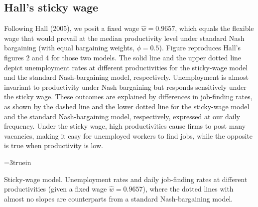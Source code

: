 \subsection{Hall's sticky wage}\label{sec:FS_Hall_simul}%
Following  Hall (2005),  we posit a
fixed wage $\hat w = 0.9657$, which  equals the flexible wage that
would prevail at the median productivity level under standard Nash
bargaining (with equal bargaining weights, $\phi=0.5$).
Figure  reproduces Hall's figures 2 and 4
for those two models. The solid line and the upper dotted line
depict unemployment rates at different productivities for the
sticky-wage model and the standard Nash-bargaining model,
respectively.
Unemployment is almost invariant to productivity under Nash bargaining
but responds sensitively under the sticky wage. These outcomes are
explained by differences in job-finding rates, as shown by the
dashed line and the lower dotted line for the
sticky-wage model and the standard Nash-bargaining model,
respectively, expressed at our daily frequency.
Under the sticky wage, high productivities cause firms to post many
vacancies, making it easy for unemployed workers to find
jobs, while the opposite is true when productivity is low.

\centerline{\epsfxsize=3truein}
\caption{Sticky-wage model. Unemployment rates and daily job-finding
rates at different productivities (given a fixed wage $\hat w = 0.9657$),
where the dotted lines with almost no slopes are counterparts from
a standard Nash-bargaining model.}
\endfigure

